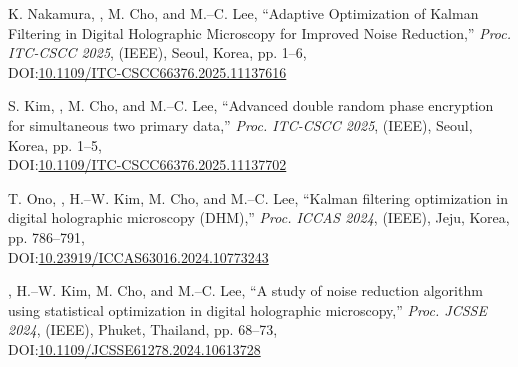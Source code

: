 \documentclass[a4paper,9pt]{extarticle}
\begin{document}
\begin{enumerate}[label={[\arabic*]}, start=1]
    \item 
    K. Nakamura, , M. Cho, and M.--C. Lee, 
    ``Adaptive Optimization of Kalman Filtering in Digital Holographic Microscopy for Improved Noise Reduction,'' 
    \textit{Proc. ITC-CSCC 2025}, (IEEE),
    Seoul, Korea, 
    pp. 1--6, \\
    DOI:\href{https://doi.org/10.1109/ITC-CSCC66376.2025.11137616}{10.1109/ITC-CSCC66376.2025.11137616}
    
    \item 
    S. Kim, , M. Cho, and M.--C. Lee, 
    ``Advanced double random phase encryption for simultaneous two primary data,'' 
    \textit{Proc. ITC-CSCC 2025}, (IEEE),
    Seoul, Korea,
    pp. 1--5, \\
    DOI:\href{https://doi.org/10.1109/ITC-CSCC66376.2025.11137702}{10.1109/ITC-CSCC66376.2025.11137702}
    
    \item 
    T. Ono, , H.--W. Kim, M. Cho, and M.--C. Lee, 
    ``Kalman filtering optimization in digital holographic microscopy (DHM),'' 
    \textit{Proc. ICCAS 2024}, (IEEE),
    Jeju, Korea, pp. 786--791, \\
    DOI:\href{https://doi.org/10.23919/ICCAS63016.2024.10773243}{10.23919/ICCAS63016.2024.10773243} 
    
    \item 
    , H.--W. Kim, M. Cho, and M.--C. Lee, 
    ``A study of noise reduction algorithm using statistical optimization in digital holographic microscopy,'' 
    \textit{Proc. JCSSE 2024}, (IEEE),
    Phuket, Thailand, pp. 68--73, \\
    DOI:\href{https://doi.org/10.1109/JCSSE61278.2024.10613728}{10.1109/JCSSE61278.2024.10613728} 
    
    
\end{enumerate} 
\end{document}

